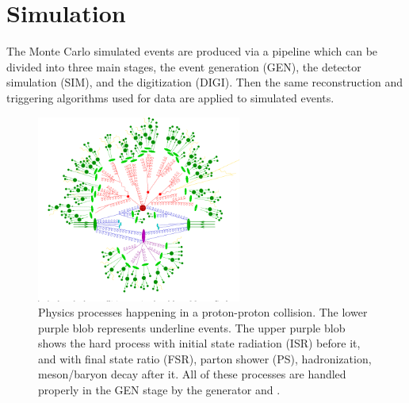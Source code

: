 
\section{Simulation}
\label{sec:cmsExperiment:simulation}



The Monte Carlo simulated events are produced via a pipeline which can be divided into three main stages, the event generation (GEN), the detector simulation (SIM), and the digitization (DIGI). Then the same reconstruction and triggering algorithms used for data are applied to simulated events.


\begin{figure}[ht]
    \centering
    \includegraphics[trim={0 0.1cm 0 0}, clip, width=0.6\textwidth]{chapters/CMSExperiment/sectionMCSimulation/figures/ps.png}
    \caption{Physics processes happening in a proton-proton collision. The lower purple blob represents underline events. The upper purple blob shows the hard process with initial state radiation (ISR) before it, and with final state ratio (FSR), parton shower (PS), hadronization, meson/baryon decay after it. All of these processes are handled properly in the GEN stage by the generator and \PYTHIA. }
    \label{fig:cmsExperiment:simulation:collision}
\end{figure}


